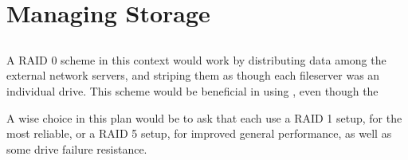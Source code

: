 \documentclass{article}
\begin{document}
\setcounter{section}{5}
\setcounter{subsection}{0}
\section*{Managing Storage}
\subsection{}
A RAID 0 scheme in this context would work by distributing data among the external network servers, and striping them as though each fileserver was an individual drive. This scheme would be beneficial in using , even though the 

A wise choice in this plan would be to ask that each use a RAID 1 setup, for the most reliable, or a RAID 5 setup, for improved general performance, as well as some drive failure resistance.

\subsection{}

\subsection{}

\subsection{}
\end{document}
